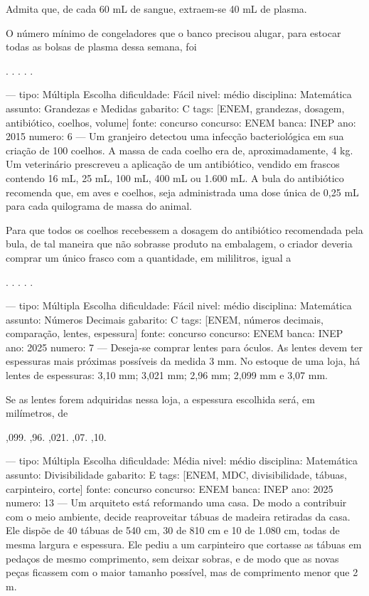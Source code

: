 Admita que, de cada 60 mL de sangue, extraem-se 40 mL de plasma.

O número mínimo de congeladores que o banco precisou alugar, para estocar todas as bolsas de plasma dessa semana, foi
\begin{choices}
.
.
.
.
.
\end{choices}

---
tipo: Múltipla Escolha
dificuldade: Fácil
nivel: médio
disciplina: Matemática
assunto: Grandezas e Medidas
gabarito: C
tags: [ENEM, grandezas, dosagem, antibiótico, coelhos, volume]
fonte: concurso
concurso: ENEM
banca: INEP
ano: 2015
numero: 6
---
\question
Um granjeiro detectou uma infecção bacteriológica em sua criação de 100 coelhos. A massa de cada coelho era de, aproximadamente, 4 kg. Um veterinário prescreveu a aplicação de um antibiótico, vendido em frascos contendo 16 mL, 25 mL, 100 mL, 400 mL ou 1.600 mL. A bula do antibiótico recomenda que, em aves e coelhos, seja administrada uma dose única de 0,25 mL para cada quilograma de massa do animal.

Para que todos os coelhos recebessem a dosagem do antibiótico recomendada pela bula, de tal maneira que não sobrasse produto na embalagem, o criador deveria comprar um único frasco com a quantidade, em mililitros, igual a
\begin{choices}
.
.
.
.
.
\end{choices}

---
tipo: Múltipla Escolha
dificuldade: Fácil
nivel: médio
disciplina: Matemática
assunto: Números Decimais
gabarito: C
tags: [ENEM, números decimais, comparação, lentes, espessura]
fonte: concurso
concurso: ENEM
banca: INEP
ano: 2025
numero: 7
---
\question
Deseja-se comprar lentes para óculos. As lentes devem ter espessuras mais próximas possíveis da medida 3 mm. No estoque de uma loja, há lentes de espessuras: 3,10 mm; 3,021 mm; 2,96 mm; 2,099 mm e 3,07 mm.

Se as lentes forem adquiridas nessa loja, a espessura escolhida será, em milímetros, de
\begin{choices}
,099.
,96.
,021.
,07.
,10.
\end{choices}

---
tipo: Múltipla Escolha
dificuldade: Média
nivel: médio
disciplina: Matemática
assunto: Divisibilidade
gabarito: E
tags: [ENEM, MDC, divisibilidade, tábuas, carpinteiro, corte]
fonte: concurso
concurso: ENEM
banca: INEP
ano: 2025
numero: 13
---
\question
Um arquiteto está reformando uma casa. De modo a contribuir com o meio ambiente, decide reaproveitar tábuas de madeira retiradas da casa. Ele dispõe de 40 tábuas de 540 cm, 30 de 810 cm e 10 de 1.080 cm, todas de mesma largura e espessura. Ele pediu a um carpinteiro que cortasse as tábuas em pedaços de mesmo comprimento, sem deixar sobras, e de modo que as novas peças ficassem com o maior tamanho possível, mas de comprimento menor que 2 m.

